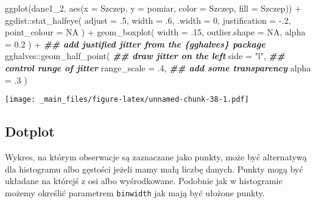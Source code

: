 \documentclass[
]{book}
\newenvironment{Shaded}{\begin{snugshade}}{\end{snugshade}}
\newcommand{\AttributeTok}[1]{\textcolor[rgb]{0.77,0.63,0.00}{#1}}
\newcommand{\ConstantTok}[1]{\textcolor[rgb]{0.00,0.00,0.00}{#1}}
\newcommand{\DecValTok}[1]{\textcolor[rgb]{0.00,0.00,0.81}{#1}}
\newcommand{\DocumentationTok}[1]{\textcolor[rgb]{0.56,0.35,0.01}{\textbf{\textit{#1}}}}
\newcommand{\FloatTok}[1]{\textcolor[rgb]{0.00,0.00,0.81}{#1}}
\newcommand{\FunctionTok}[1]{\textcolor[rgb]{0.00,0.00,0.00}{#1}}
\newcommand{\NormalTok}[1]{#1}
\newcommand{\SpecialCharTok}[1]{\textcolor[rgb]{0.00,0.00,0.00}{#1}}
\newcommand{\StringTok}[1]{\textcolor[rgb]{0.31,0.60,0.02}{#1}}
\begin{document}
\begin{Shaded}
\begin{Highlighting}[]
\FunctionTok{ggplot}\NormalTok{(dane1\_2, }\FunctionTok{aes}\NormalTok{(}\AttributeTok{x =}\NormalTok{ Szczep, }\AttributeTok{y =}\NormalTok{ pomiar, }\AttributeTok{color =}\NormalTok{ Szczep, }\AttributeTok{fill =}\NormalTok{ Szczep)) }\SpecialCharTok{+} 
\NormalTok{  ggdist}\SpecialCharTok{::}\FunctionTok{stat\_halfeye}\NormalTok{(}
    \AttributeTok{adjust =}\NormalTok{ .}\DecValTok{5}\NormalTok{, }
    \AttributeTok{width =}\NormalTok{ .}\DecValTok{6}\NormalTok{, }
    \AttributeTok{.width =} \DecValTok{0}\NormalTok{, }
    \AttributeTok{justification =} \SpecialCharTok{{-}}\NormalTok{.}\DecValTok{2}\NormalTok{, }
    \AttributeTok{point\_colour =} \ConstantTok{NA}
\NormalTok{  ) }\SpecialCharTok{+} 
  \FunctionTok{geom\_boxplot}\NormalTok{(}
    \AttributeTok{width =}\NormalTok{ .}\DecValTok{15}\NormalTok{, }
    \AttributeTok{outlier.shape =} \ConstantTok{NA}\NormalTok{,}
    \AttributeTok{alpha =} \FloatTok{0.2}
\NormalTok{  ) }\SpecialCharTok{+}
  \DocumentationTok{\#\# add justified jitter from the \{gghalves\} package}
\NormalTok{  gghalves}\SpecialCharTok{::}\FunctionTok{geom\_half\_point}\NormalTok{(}
    \DocumentationTok{\#\# draw jitter on the left}
    \AttributeTok{side =} \StringTok{"l"}\NormalTok{, }
    \DocumentationTok{\#\# control range of jitter}
    \AttributeTok{range\_scale =}\NormalTok{ .}\DecValTok{4}\NormalTok{, }
    \DocumentationTok{\#\# add some transparency}
    \AttributeTok{alpha =}\NormalTok{ .}\DecValTok{3}
\NormalTok{  ) }
\end{Highlighting}
\end{Shaded}

\texttt{[image: \_main\_files/figure-latex/unnamed-chunk-38-1.pdf]}

\hypertarget{dotplot}{%
\subsection{Dotplot}\label{dotplot}}

Wykres, na którym obserwacje są zaznaczane jako punkty, może być alternatywą dla histogramu albo gęstości jeżeli mamy małą liczbę danych. Punkty mogą być układane na którejś z osi albo wyśrodkowane. Podobnie jak w histogramie możemy określić parametrem \texttt{binwidth} jak mają być ułożone punkty.
\end{document}
